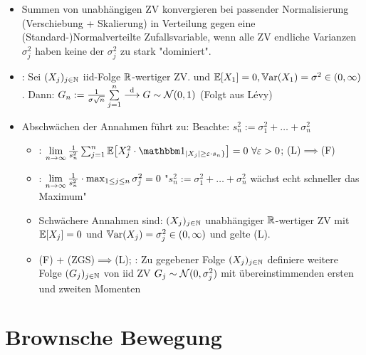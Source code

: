 \documentclass[12pt]{scrartcl}
\begin{document}
	\begin{itemize}
		\item Summen von unabhängigen ZV konvergieren bei passender Normalisierung (Verschiebung + Skalierung) in Verteilung gegen eine (Standard-)Normalverteilte Zufallsvariable, wenn alle ZV endliche Varianzen $\sigma_j^2$ haben  keine der $\sigma_j^2$ zu stark "dominiert".
		\item {}: Sei $(X_j)_{j\in\mathbb{N}}$ iid-Folge $\mathbb{R}$-wertiger ZV. und $\mathbb{E}[X_1]=0,\mathbb{V}\text{ar}(X_1)=\sigma^2\in(0,\infty)$. Dann: $G_n:=\frac{1}{\sigma\sqrt{n}}\sum\limits_{j=1}^n\overset{\mathrm{d}}{\longrightarrow} G\sim\mathcal{N}(0,1)$ (Folgt aus Lévy)
		\item Abschwächen der Annahmen führt zu:  Beachte: $s_n^2:=\sigma_1^2+\ldots+\sigma_n^2$
		\begin{itemize}
			\item {}: $\limn\frac{1}{s_n^2}\sum_{j=1}^n\E\big[X_j^2\cdot\indi_{|X_j|\geq\varepsilon\cdot s_n\rbrace}\big]=0~\forall\varepsilon>0$; (L)$\implies$(F)
			\item {}: $\lim\limits_{n\to\infty}\frac{1}{s_n^2}\cdot\max_{1\leq j\leq n}\sigma_j^2=0$
			"$s_n^2:=\sigma_1^2+\ldots+\sigma_n^2$ wächst echt schneller das Maximum"
			\item Schwächere Annahmen sind: $(X_j)_{j\in\mathbb{N}}$ unabhängiger $\mathbb{R}$-wertiger ZV mit $\mathbb{E}[X_j]=0$ und $\mathbb{V}\text{ar}(X_j)=\sigma_j^2\in(0,\infty)$ und gelte (L).
			\item (F) + (ZGS)$\implies$(L); : Zu gegebener Folge $(X_j)_{j\in\mathbb{N}}$ definiere weitere Folge $(G_j)_{j\in\mathbb{N}}$ von iid ZV $G_j\sim\mathcal{N}(0,\sigma_j^2)$ mit übereinstimmenden ersten und zweiten Momenten
		\end{itemize}
	\end{itemize}
	
	\section{Brownsche Bewegung}
	
\end{document}
